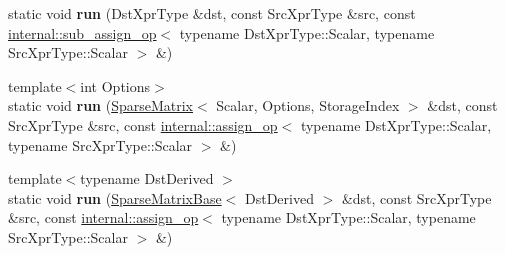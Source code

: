 \begin{DoxyCompactItemize}
\mbox{\label{struct_eigen_1_1internal_1_1_assignment_3_01_dst_xpr_type_00_01_src_xpr_type_00_01_functor_00_01_diagonal2_sparse_01_4_a6c98a58cd979be473443ee7b6c5fed0e}} 
static void {\bfseries run} (Dst\+Xpr\+Type \&dst, const Src\+Xpr\+Type \&src, const \hyperlink{struct_eigen_1_1internal_1_1sub__assign__op}{internal\+::sub\+\_\+assign\+\_\+op}$<$ typename Dst\+Xpr\+Type\+::\+Scalar, typename Src\+Xpr\+Type\+::\+Scalar $>$ \&)
\item 
\mbox{\label{struct_eigen_1_1internal_1_1_assignment_3_01_dst_xpr_type_00_01_src_xpr_type_00_01_functor_00_01_diagonal2_sparse_01_4_a3ebebc30f1ceca09787e5ad5c0fd9c43}} 
{\footnotesize template$<$int Options$>$ }\\static void {\bfseries run} (\hyperlink{group___sparse_core___module_class_eigen_1_1_sparse_matrix}{Sparse\+Matrix}$<$ Scalar, Options, Storage\+Index $>$ \&dst, const Src\+Xpr\+Type \&src, const \hyperlink{struct_eigen_1_1internal_1_1assign__op}{internal\+::assign\+\_\+op}$<$ typename Dst\+Xpr\+Type\+::\+Scalar, typename Src\+Xpr\+Type\+::\+Scalar $>$ \&)
\item 
\mbox{\label{struct_eigen_1_1internal_1_1_assignment_3_01_dst_xpr_type_00_01_src_xpr_type_00_01_functor_00_01_diagonal2_sparse_01_4_af302c9a90f62006c28bec8184a1c3c08}} 
{\footnotesize template$<$typename Dst\+Derived $>$ }\\static void {\bfseries run} (\hyperlink{group___sparse_core___module_class_eigen_1_1_sparse_matrix_base}{Sparse\+Matrix\+Base}$<$ Dst\+Derived $>$ \&dst, const Src\+Xpr\+Type \&src, const \hyperlink{struct_eigen_1_1internal_1_1assign__op}{internal\+::assign\+\_\+op}$<$ typename Dst\+Xpr\+Type\+::\+Scalar, typename Src\+Xpr\+Type\+::\+Scalar $>$ \&)
\item 
\mbox{\label{struct_eigen_1_1internal_1_1_assignment_3_01_dst_xpr_type_00_01_src_xpr_type_00_01_functor_00_01_diagonal2_sparse_01_4_aa5fb6b65cca9c9cbafd0102a9b8184dc}} 

\end{DoxyCompactItemize}
